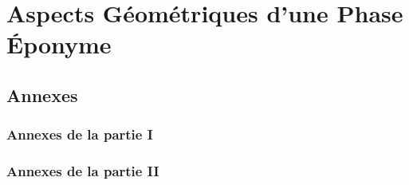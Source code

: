 \part{Aspects Géométriques d'une Phase Éponyme} \label{part:phase_geo} 




\begin{annexe}
	\part*{Annexes}
	
	\section{Annexes de la partie I} 
	
	\section{Annexes de la partie II}
		
\end{annexe}

	

	
	
	
	

\newpage


 {}
\listoffigures

\vfill


\lstlistoflistings

\vfill




\newpage

{}


